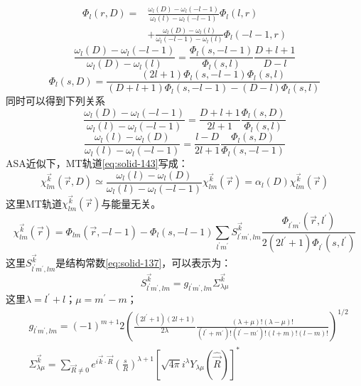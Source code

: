 \begin{equation}
  \begin{split}
   \Phi_l(r,D)=&\frac{\omega_l(D)-\omega_l(-l-1)}{\omega_l(l)-\omega_l(-l-1)}\Phi_l(l,r)\\
   &+\frac{\omega_l(D)-\omega_l(l)}{\omega_l(-l-1)-\omega_l(l)}\Phi_l(-l-1,r)
  \end{split}
  \label{eq:solid-156}
\end{equation}
\begin{equation}
  \frac{\omega_l(D)-\omega_l(-l-1)}{\omega_l(D)-\omega_l(l)}=\frac{\Phi_l(s,-l-1)}{\Phi_l(s,l)}\frac{D+l+1}{D-l}
  \label{eq:solid-157}
\end{equation}
\begin{equation}
  \Phi_l(s,D)=\frac{(2l+1)\Phi_l(s,-l-1)\Phi_l(s,l)}{(D+l+1)\Phi_l(s,-l-1)-(D-l)\Phi_l(s,l)}
  \label{eq:solid-158}
\end{equation}
同时可以得到下列关系
\begin{equation}
  \frac{\omega_l(D)-\omega_l(-l-1)}{\omega_l(l)-\omega_l(-l-1)}=\frac{D+l+1}{2l+1}\frac{\Phi_l(s,D)}{\Phi_l(s,l)}
  \label{eq:solid-159}
\end{equation}
\begin{equation}
  \frac{\omega_l(l)-\omega_l(D)}{\omega_l(l)-\omega_l(-l-1)}=\frac{l-D}{2l+1}\frac{\Phi_l(s,D)}{\Phi_l(s,-l-1)}
  \label{eq:solid-160}
\end{equation}
ASA近似下，MT轨道\eqref{eq:solid-143}写成：
\begin{equation}
  \chi_{lm}^{\vec k}(\vec r,D)\simeq\frac{\omega_l(l)-\omega_l(D)}{\omega_l(l)-\omega_l(-l-1)}\chi_{lm}^{\vec k}(\vec r)=\alpha_l(D)\chi_{lm}^{\vec k}(\vec r)
  \label{eq:solid-161}
\end{equation}
这里MT轨道$\chi_{lm}^{\vec k}(\vec r)$与能量无关。
\begin{equation}
  \chi_{lm}^{\vec k}(\vec r)=\Phi_{lm}(\vec r,-l-1)-\Phi_l(s,-l-1)\sum_{l^{\prime}m^{\prime}}S_{l^{\prime}m^{\prime},lm}^{\vec k}\frac{\Phi_{l^{\prime}m^{\prime}}(\vec r,l^{\prime})}{2(2l^{\prime}+1)\Phi_{l^{\prime}}(s,l^{\prime})}
  \label{eq:solid-162}
\end{equation}
这里$S_{l^{\prime}m^{\prime},lm}^{\vec k}$是结构常数\eqref{eq:solid-137}，可以表示为\cite{PRB12-3060_1975}：
\begin{equation}
  S_{l^{\prime}m^{\prime},lm}^{\vec k}=g_{l^{\prime}m^{\prime},lm}\Sigma_{\lambda\mu}^{\vec k}
  \label{eq:solid-163}
\end{equation}
这里$\lambda=l^{\prime}+l$；$\mu=m^{\prime}-m$；
\begin{displaymath}
  \begin{aligned}
    &g_{l^{\prime}m^{\prime},lm}=(-1)^{m+1}2\left(\frac{(2l^{\prime}+1)(2l+1)}{2\lambda}\frac{(\lambda+\mu)!(\lambda-\mu)!}{(l^{\prime}+m^{\prime})!(l^{\prime}-m^{\prime})!(l+m)!(l-m)!}\right)^{1/2}\\
    &\Sigma_{\lambda\mu}^{\vec k}=\sum_{\vec R\neq0}e^{i\vec k\cdot\vec R}\left(\frac sR\right)^{\lambda+1}[\sqrt{4\pi}i^{\lambda}Y_{\lambda\mu}(\hat{\vec R})]^{\ast}
  \end{aligned}
\end{displaymath}
